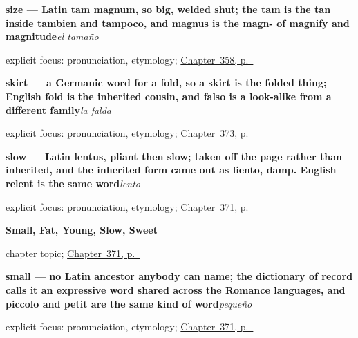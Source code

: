 \noindent\begin{minipage}[t]{\linewidth}
\raggedright
\textbf{size — Latin tam magnum, so big, welded shut; the tam is the tan inside tambien and tampoco, and magnus is the magn- of magnify and magnitude}\enspace\emph{el tamaño}\par
\footnotesize explicit focus: pronunciation, etymology; \hyperref[ch:el-color-y-el-tamano]{Chapter~358, p.~\pageref*{ch:el-color-y-el-tamano}}
\end{minipage}\par\smallskip

\noindent\begin{minipage}[t]{\linewidth}
\raggedright
\textbf{skirt — a Germanic word for a fold, so a skirt is the folded thing; English fold is the inherited cousin, and falso is a look-alike from a different family}\enspace\emph{la falda}\par
\footnotesize explicit focus: pronunciation, etymology; \hyperref[ch:el-oro-y-la-botella]{Chapter~373, p.~\pageref*{ch:el-oro-y-la-botella}}
\end{minipage}\par\smallskip

\noindent\begin{minipage}[t]{\linewidth}
\raggedright
\textbf{slow — Latin lentus, pliant then slow; taken off the page rather than inherited, and the inherited form came out as liento, damp. English relent is the same word}\enspace\emph{lento}\par
\footnotesize explicit focus: pronunciation, etymology; \hyperref[ch:pequeno-y-gordo]{Chapter~371, p.~\pageref*{ch:pequeno-y-gordo}}
\end{minipage}\par\smallskip

\noindent\begin{minipage}[t]{\linewidth}
\raggedright
\textbf{Small, Fat, Young, Slow, Sweet}\par
\footnotesize chapter topic; \hyperref[ch:pequeno-y-gordo]{Chapter~371, p.~\pageref*{ch:pequeno-y-gordo}}
\end{minipage}\par\smallskip

\noindent\begin{minipage}[t]{\linewidth}
\raggedright
\textbf{small — no Latin ancestor anybody can name; the dictionary of record calls it an expressive word shared across the Romance languages, and piccolo and petit are the same kind of word}\enspace\emph{pequeño}\par
\footnotesize explicit focus: pronunciation, etymology; \hyperref[ch:pequeno-y-gordo]{Chapter~371, p.~\pageref*{ch:pequeno-y-gordo}}
\end{minipage}\par\smallskip


